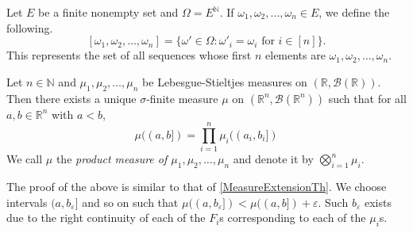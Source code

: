 \vspace{2mm}
Let $E$ be a finite nonempty set and $\Omega = E^\mathbb{N}$. If $\omega_1,\omega_2,\ldots,\omega_n\in E$, we define the following.
$$[\omega_1,\omega_2,\ldots,\omega_n]=\{\omega'\in\Omega : \omega'_i=\omega_i\text{ for }i\in[n]\}.$$
This represents the set of all sequences whose first $n$ elements are $\omega_1,\omega_2,\ldots,\omega_n$.

\begin{theorem}
        Let $n\in\mathbb{N}$ and $\mu_1,\mu_2,\ldots,\mu_n$ be Lebesgue-Stieltjes measures on $(\mathbb{R},\mathcal{B}(\mathbb{R}))$. Then there exists a unique $\sigma$-finite measure $\mu$ on $(\mathbb{R}^n, \mathcal{B}(\mathbb{R}^n))$ such that for all $a,b\in\mathbb{R}^n$ with $a<b$,
        $$\mu((a,b])=\prod_{i=1}^n \mu_i((a_i,b_i])$$
        We call $\mu$ the \textit{product measure of $\mu_1,\mu_2,\ldots,\mu_n$} and denote it by $\bigotimes_{i=1}^n\mu_i$.
\end{theorem}

The proof of the above is similar to that of \cref{MeasureExtensionTh}. We choose intervals $(a,b_\varepsilon]$ and so on such that $\mu((a,b_\varepsilon])<\mu((a,b])+\varepsilon$. Such $b_\varepsilon$ exists due to the right continuity of each of the $F_i$s corresponding to each of the $\mu_i$s.

\clearpage